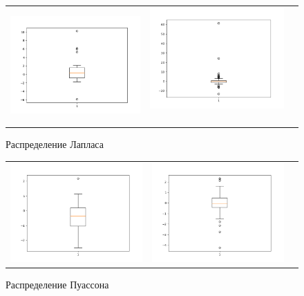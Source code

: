 	\begin{figure}[H]
		\centering
		\begin{tabular}{ccc}
			\includegraphics[width=55mm, height =0.25\textheight]{pics/l20.png}
			&
			\includegraphics[width=55mm, height =0.25\textheight]{pics/l100.png}\
		\end{tabular}
		\caption{Распределение Лапласа}
		\label{fig:laplace}
	\end{figure}


	\begin{figure}[H]
		\centering
		\begin{tabular}{ccc}
			\includegraphics[width=55mm, height =0.25\textheight]{pics/p20.png}
			&
			\includegraphics[width=55mm, height =0.25\textheight]{pics/p100.png}
		\end{tabular}
		\caption{Распределение Пуассона}
		\label{fig:poisson}
	\end{figure}


